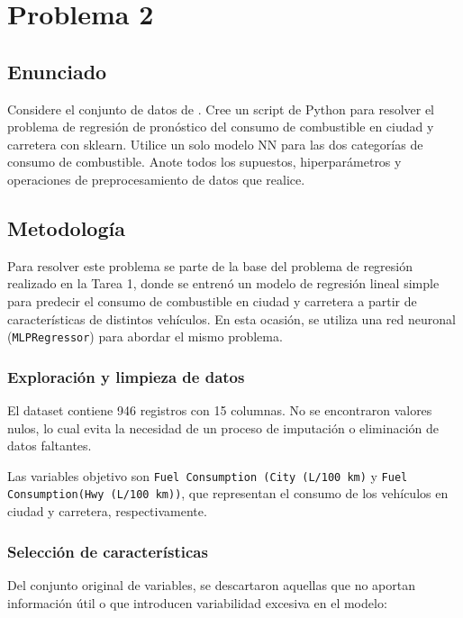 \documentclass{article}
\begin{document}
\section{Problema 2}

\subsection{Enunciado}

Considere el conjunto de datos de \cite{kaggleFuel2022}. Cree un script de Python para resolver el problema de regresión de pronóstico del consumo de combustible en ciudad y carretera con sklearn. Utilice un solo modelo NN para las dos categorías de consumo de combustible. Anote todos los supuestos, hiperparámetros y operaciones de preprocesamiento de datos que realice.

\subsection{Metodología}

Para resolver este problema se parte de la base del problema de regresión realizado en la Tarea 1, donde se entrenó un modelo de regresión lineal simple para predecir el consumo de combustible en ciudad y carretera a partir de características de distintos vehículos. En esta ocasión, se utiliza una red neuronal (\texttt{MLPRegressor}) para abordar el mismo problema.

\subsubsection{Exploración y limpieza de datos}

El dataset contiene 946 registros con 15 columnas. No se encontraron valores nulos, lo cual evita la necesidad de un proceso de imputación o eliminación de datos faltantes.

Las variables objetivo son \texttt{Fuel Consumption (City (L/100 km)} y \texttt{Fuel Consumption(Hwy (L/100 km))}, que representan el consumo de los vehículos en ciudad y carretera, respectivamente.

\subsubsection{Selección de características}

Del conjunto original de variables, se descartaron aquellas que no aportan información útil o que introducen variabilidad excesiva en el modelo:
\end{document}
